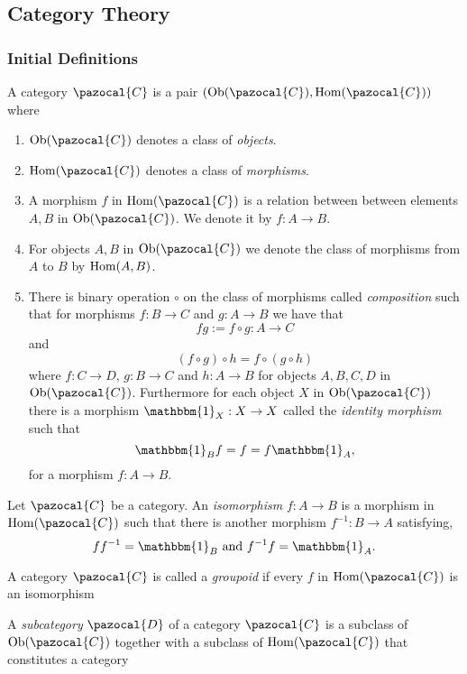\subsection{Category Theory}
\subsubsection{Initial Definitions}
\begin{definition}
    A category $\pazocal{C}$ is a pair $(\Ob(\pazocal{C}),\Hom(\pazocal{C}))$ where 
    \begin{enumerate} 
    \item $\Ob(\pazocal{C})$ denotes a class of \textit{objects}. \item $\Hom(\pazocal{C})$ denotes a class of \textit{morphisms}. 
    \item A morphism $f$ in $\Hom(\pazocal{C})$ is a relation between between elements $A,B$ in $\Ob(\pazocal{C})$. We denote it by $f : A \rightarrow B$. 
    \item For objects $A,B$ in $\Ob(\pazocal{C})$ we denote the class of morphisms from $A$ to $B$ by $\mathrm{Hom}(A,B)$.
    \item There is binary operation $\circ$ on the class of morphisms called \textit{composition} such that for morphisms $f: B\rightarrow C$ and $g : A \rightarrow B$ we have that
    $$fg := f\circ g : A \rightarrow C$$
    and 
    $$(f\circ g)\circ h = f\circ(g\circ h)$$
    where $f : C \rightarrow D$, $g: B \rightarrow C$ and $h: A \rightarrow B$ for objects $A,B,C,D$ in $\Ob(\pazocal{C})$. Furthermore for each object $X$ in $\Ob(\pazocal{C})$ there is a morphism $\mathbbm{1}_X : X \rightarrow X$ called the \textit{identity morphism} such that 
    $$\mathbbm{1}_B f = f = f \mathbbm{1}_A,$$
    for a morphism $f: A \rightarrow B$.
    \end{enumerate}
\end{definition}
\begin{definition}
    Let $\pazocal{C}$ be a category. An \textit{isomorphism} $f:A \rightarrow B$ is a morphism in $\Hom(\pazocal{C})$ such that there is another morphism $f^{-1} : B\rightarrow A$ satisfying,
    $$ff^{-1} = \mathbbm{1}_B \ \mathrm{ and } \ f^{-1}f = \mathbbm{1}_A.$$
\end{definition}
\begin{definition}
    A category $\pazocal{C}$ is called a \textit{groupoid} if every $f$ in $\Hom(\pazocal{C})$ is an isomorphism
\end{definition}
\begin{definition}
    A \textit{subcategory} $\pazocal{D}$ of a category $\pazocal{C}$ is a subclass of $\Ob(\pazocal{C})$ together with a subclass of $\Hom(\pazocal{C})$ that constitutes a category
\end{definition}
